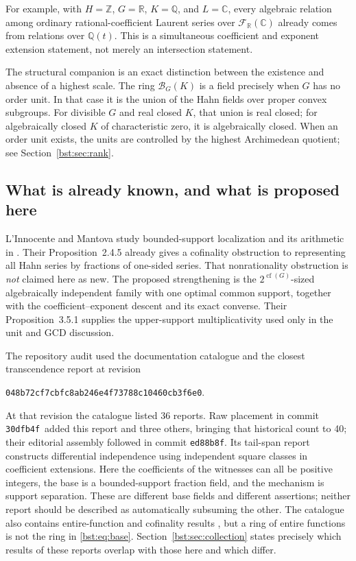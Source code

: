 \documentclass[11pt,letterpaper]{article}
\theoremstyle{definition}
\theoremstyle{remark}
\newcommand{\Q}{\mathbb Q}
\newcommand{\R}{\mathbb R}
\newcommand{\C}{\mathbb C}
\newcommand{\Z}{\mathbb Z}
\newcommand{\cof}{\operatorname{cf}}
\newcommand{\BB}[2]{\mathcal B_{#2}(#1)}
\newcommand{\FF}[2]{\mathcal F_{#2}(#1)}
\newcommand{\auditcommit}{\texttt{048b72cf7cbfc8ab246e4f73788c10460cb3f6e0}}
\newcommand{\placecommit}{\texttt{30dfb4f}}
\newcommand{\assemblycommit}{\texttt{ed88b8f}}
\begin{document}
For example, with $H=\Z$, $G=\R$, $K=\Q$, and $L=\C$, every algebraic
relation among ordinary rational-coefficient Laurent series over
$\FF{\C}{\R}$ already comes from relations over $\Q(t)$. This is a
simultaneous coefficient and exponent extension statement, not merely an
intersection statement.

The structural companion is an exact distinction between the existence and
absence of a highest scale. The ring $\BB KG$ is a field precisely when $G$
has no order unit. In that case it is the union of the Hahn fields over
proper convex subgroups. For divisible $G$ and real closed $K$, that union is real closed; for
algebraically closed $K$ of characteristic zero, it is algebraically closed.
When an order unit exists, the units are controlled by the highest
Archimedean quotient; see Section~\ref{bst:sec:rank}.

\subsection{What is already known, and what is proposed here}

L'Innocente and Mantova study bounded-support localization and its arithmetic
in \cite{LM24}. Their Proposition~2.4.5 already gives a cofinality obstruction
to representing all Hahn series by fractions of one-sided series. That
nonrationality obstruction is \emph{not} claimed here as new. The proposed
strengthening is the $2^{\cof(G)}$-sized algebraically independent family with
one optimal common support, together with the coefficient--exponent descent
and its exact converse. Their Proposition~3.5.1 supplies the upper-support
multiplicativity used only in the unit and GCD discussion.

The repository audit used the documentation catalogue and the closest
transcendence report at revision
\begin{center}\small\auditcommit.\end{center}
At that revision the catalogue listed 36 reports. Raw placement in commit
\placecommit\ added this report and three others, bringing that historical
count to 40; their editorial assembly followed in commit \assemblycommit. Its tail-span report \cite{RepoTail}
constructs differential independence using independent square classes in
coefficient extensions. Here the coefficients of the witnesses can all be
positive integers, the base is a bounded-support fraction field, and the
mechanism is support separation. These are different base fields and
different assertions; neither report should be described as automatically
subsuming the other. The catalogue also contains entire-function and
cofinality results \cite{RepoEntire}, but a ring of entire functions is not
the ring in \eqref{bst:eq:base}. Section~\ref{bst:sec:collection} states
precisely which results of these reports overlap with those here and which
differ.
\end{document}
